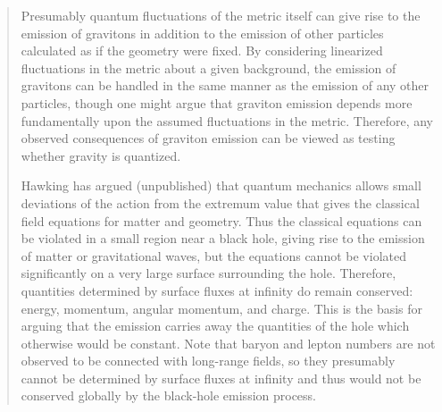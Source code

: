 \documentclass[12pt]{article} \usepackage{latexsym} \textwidth 15cm
\begin{document}
\begin{quotation}
Presumably quantum fluctuations of the metric itself can give rise to
the emission of gravitons in addition to the emission of other
particles calculated as if the geometry were fixed.  By considering
linearized fluctuations in the metric about a given background, the
emission of gravitons can be handled in the same manner as the
emission of any other particles, though one might argue that graviton
emission depends more fundamentally upon the assumed fluctuations in
the metric.  Therefore, any observed consequences of graviton emission
can be viewed as testing whether gravity is quantized.

Hawking has argued (unpublished) that quantum mechanics allows small
deviations of the action from the extremum value that gives the
classical field equations for matter and geometry.  Thus the classical
equations can be violated in a small region near a black hole, giving
rise to the emission of matter or gravitational waves, but the
equations cannot be violated significantly on a very large surface
surrounding the hole.  Therefore, quantities determined by surface
fluxes at infinity do remain conserved: energy, momentum, angular
momentum, and charge.  This is the basis for arguing that the emission
carries away the quantities of the hole which otherwise would be
constant.  Note that baryon and lepton numbers are not observed to be
connected with long-range fields, so they presumably cannot be
determined by surface fluxes at infinity and thus would not be
conserved globally by the black-hole emission process.


\end{quotation}
\end{document}

